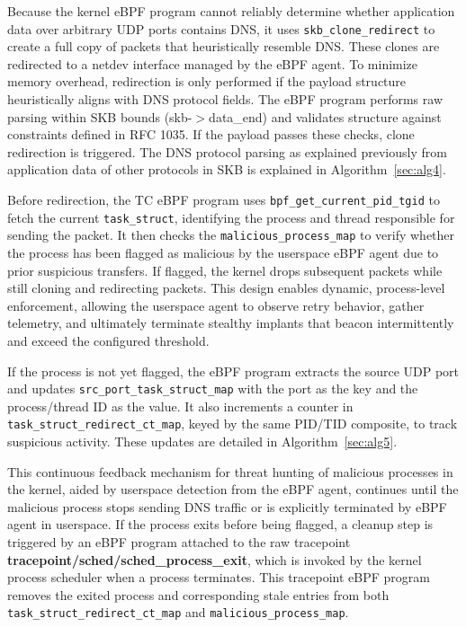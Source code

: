 \documentclass [11pt, proquest] {uwthesis}[2020/02/24]
\begin{document}
Because the kernel eBPF program cannot reliably determine whether application data over arbitrary UDP ports contains DNS, it uses \texttt{skb\_clone\_redirect} to create a full copy of packets that heuristically resemble DNS. These clones are redirected to a netdev interface managed by the eBPF agent. To minimize memory overhead, redirection is only performed if the payload structure heuristically aligns with DNS protocol fields. The eBPF program performs raw parsing within SKB bounds (skb-$>$data\_end) and validates structure against constraints defined in RFC 1035. If the payload passes these checks, clone redirection is triggered. The DNS protocol parsing as explained previously from application data of other protocols in SKB is explained in Algorithm~\ref{sec:alg4}.

Before redirection, the TC eBPF program uses \texttt{bpf\_get\_current\_pid\_tgid} to fetch the current \texttt{task\_struct}, identifying the process and thread responsible for sending the packet. It then checks the \texttt{malicious\_process\_map} to verify whether the process has been flagged as malicious by the userspace eBPF agent due to prior suspicious transfers. If flagged, the kernel drops subsequent packets while still cloning and redirecting packets. This design enables dynamic, process-level enforcement, allowing the userspace agent to observe retry behavior, gather telemetry, and ultimately terminate stealthy implants that beacon intermittently and exceed the configured threshold.

If the process is not yet flagged, the eBPF program extracts the source UDP port and updates \texttt{src\_port\_task\_struct\_map} with the port as the key and the process/thread ID as the value. It also increments a counter in \texttt{task\_struct\_redirect\_ct\_map}, keyed by the same PID/TID composite, to track suspicious activity. These updates are detailed in Algorithm~\ref{sec:alg5}.

This continuous feedback mechanism for threat hunting of malicious processes in the kernel, aided by userspace detection from the eBPF agent, continues until the malicious process stops sending DNS traffic or is explicitly terminated by eBPF agent in userspace. If the process exits before being flagged, a cleanup step is triggered by an eBPF program attached to the raw tracepoint \textbf{tracepoint/sched/sched\_process\_exit}, which is invoked by the kernel process scheduler when a process terminates. This tracepoint eBPF program removes the exited process and corresponding stale entries from both \texttt{task\_struct\_redirect\_ct\_map} and \texttt{malicious\_process\_map}.
\end{document}
